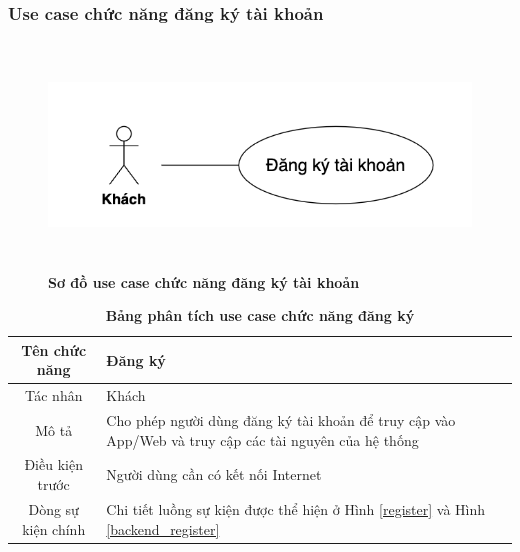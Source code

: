 \subsubsection{Use case chức năng đăng ký tài khoản}
  \begin{figure}[H]
    \centering
    \includegraphics[width=15cm,height=6cm]{Images/use_case/use_case_register.png}
    \caption[Sơ đồ use case chức năng đăng ký tài khoản]{\bfseries \fontsize{12pt}{0pt}
    \selectfont Sơ đồ use case chức năng đăng ký tài khoản}
    \label{use_case_register} %
  \end{figure}

  \begin{table}[H]
    \caption{\bfseries \fontsize{12pt}{0pt}\selectfont Bảng phân tích use case chức năng đăng ký}
    \centering
    \begin{tabularx}{0.9\textwidth}{|c|X|}
      \hline
      \textbf{Tên chức năng} & \textbf{Đăng ký} \\
      \hline
      Tác nhân & Khách \\
      \hline
      Mô tả & Cho phép người dùng đăng ký tài khoản để truy cập vào App/Web 
      và truy cập các tài nguyên của hệ thống \\
      \hline
      Điều kiện trước & Người dùng cần có kết nối Internet \\
      \hline
      Dòng sự kiện chính & 
        Chi tiết luồng sự kiện được thể hiện ở Hình \ref{register} và Hình \ref{backend_register}\\
      \hline
    \end{tabularx}
  \end{table}

